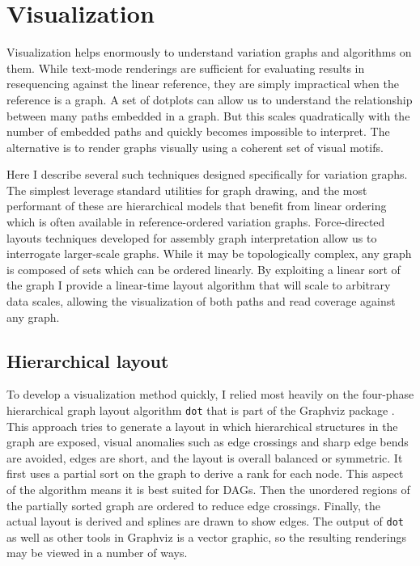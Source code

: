 \section{Visualization}

Visualization helps enormously to understand variation graphs and algorithms on them.
While text-mode renderings are sufficient for evaluating results in resequencing against the linear reference, they are simply impractical when the reference is a graph.
A set of dotplots can allow us to understand the relationship between many paths embedded in a graph.
But this scales quadratically with the number of embedded paths and quickly becomes impossible to interpret.
The alternative is to render graphs visually using a coherent set of visual motifs.

Here I describe several such techniques designed specifically for variation graphs.
The simplest leverage standard utilities for graph drawing, and the most performant of these are hierarchical models that benefit from linear ordering which is often available in reference-ordered variation graphs.
Force-directed layouts techniques developed for assembly graph interpretation allow us to interrogate larger-scale graphs.
While it may be topologically complex, any graph is composed of sets which can be ordered linearly.
By exploiting a linear sort of the graph I provide a linear-time layout algorithm that will scale to arbitrary data scales, allowing the visualization of both paths and read coverage against any graph.

\subsection{Hierarchical layout}

To develop a visualization method quickly, I relied most heavily on the four-phase hierarchical graph layout algorithm {\tt dot} \cite{gansner1993technique} that is part of the Graphviz package \cite{gansner2000open,ellson2001graphviz}.
This approach tries to generate a layout in which hierarchical structures in the graph are exposed, visual anomalies such as edge crossings and sharp edge bends are avoided, edges are short, and the layout is overall balanced or symmetric.
It first uses a partial sort on the graph to derive a rank for each node.
This aspect of the algorithm means it is best suited for DAGs.
Then the unordered regions of the partially sorted graph are ordered to reduce edge crossings.
Finally, the actual layout is derived and splines are drawn to show edges.
The output of {\tt dot} as well as other tools in Graphviz is a vector graphic, so the resulting renderings may be viewed in a number of ways.


